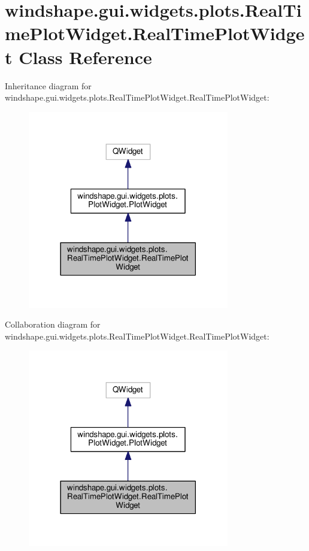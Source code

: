 \hypertarget{classwindshape_1_1gui_1_1widgets_1_1plots_1_1_real_time_plot_widget_1_1_real_time_plot_widget}{}\section{windshape.\+gui.\+widgets.\+plots.\+Real\+Time\+Plot\+Widget.\+Real\+Time\+Plot\+Widget Class Reference}
\label{classwindshape_1_1gui_1_1widgets_1_1plots_1_1_real_time_plot_widget_1_1_real_time_plot_widget}


Inheritance diagram for windshape.\+gui.\+widgets.\+plots.\+Real\+Time\+Plot\+Widget.\+Real\+Time\+Plot\+Widget\+:\nopagebreak
\begin{figure}[H]
\begin{center}
\leavevmode
\includegraphics[width=249pt]{classwindshape_1_1gui_1_1widgets_1_1plots_1_1_real_time_plot_widget_1_1_real_time_plot_widget__inherit__graph}
\end{center}
\end{figure}


Collaboration diagram for windshape.\+gui.\+widgets.\+plots.\+Real\+Time\+Plot\+Widget.\+Real\+Time\+Plot\+Widget\+:\nopagebreak
\begin{figure}[H]
\begin{center}
\leavevmode
\includegraphics[width=249pt]{classwindshape_1_1gui_1_1widgets_1_1plots_1_1_real_time_plot_widget_1_1_real_time_plot_widget__coll__graph}
\end{center}
\end{figure}
